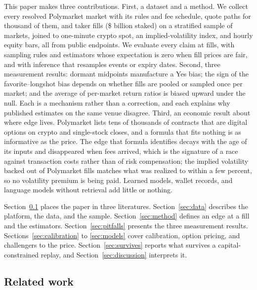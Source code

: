 \documentclass[format=acmsmall, review=false]{acmart}
\begin{document}
This paper makes three contributions. First, a dataset and a method. We collect every resolved Polymarket market with its rules and fee schedule, quote paths for \quoteMarketsK{} thousand of them, and \tapeFills{} taker fills (\$\tapeUsdB{} billion staked) on a stratified sample of \tapeMarkets{} markets, joined to one-minute crypto spot, an implied-volatility index, and hourly equity bars, all from public endpoints. We evaluate every claim at fills, with sampling rules and estimators whose expectation is zero when fill prices are fair, and with inference that resamples events or expiry dates. Second, three measurement results: dormant midpoints manufacture a Yes bias; the sign of the favorite--longshot bias depends on whether fills are pooled or sampled once per market; and the average of per-market return ratios is biased upward under the null. Each is a mechanism rather than a correction, and each explains why published estimates on the same venue disagree. Third, an economic result about where edge lives. Polymarket lists tens of thousands of contracts that are digital options on crypto and single-stock closes, and a formula that fits nothing is as informative as the price. The edge that formula identifies decays with the age of its inputs and disappeared when fees arrived, which is the signature of a race against transaction costs rather than of risk compensation; the implied volatility backed out of Polymarket fills matches what was realized to within a few percent, so no volatility premium is being paid. Learned models, wallet records, and language models without retrieval add little or nothing.

Section~\ref{sec:related} places the paper in three literatures. Section~\ref{sec:data} describes the platform, the data, and the sample. Section~\ref{sec:method} defines an edge at a fill and the estimators. Section~\ref{sec:pitfalls} presents the three measurement results. Sections~\ref{sec:calibration} to \ref{sec:models} cover calibration, option pricing, and challengers to the price. Section~\ref{sec:survives} reports what survives a capital-constrained replay, and Section~\ref{sec:discussion} interprets it.

\subsection{Related work}\label{sec:related}
\end{document}
